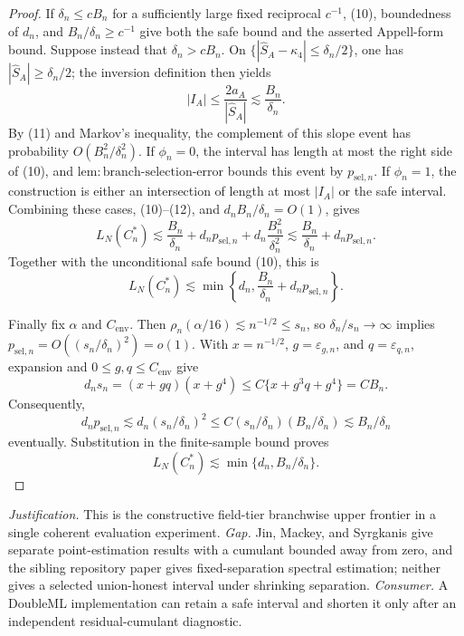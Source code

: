 \documentclass{article}
\begin{document}
\begin{proof}
If \(\delta_n\le cB_n\) for a sufficiently large fixed reciprocal \(c^{-1}\), (10), boundedness of \(d_n\), and \(B_n/\delta_n\ge c^{-1}\) give both the safe bound and the asserted Appell-form bound.  Suppose instead that \(\delta_n>cB_n\).  On \(\{|\widehat S_A-\kappa_4|\le\delta_n/2\}\), one has \(|\widehat S_A|\ge\delta_n/2\); the inversion definition then yields
\[
|I_A|\le\frac{2a_A}{|\widehat S_A|}\lesssim\frac{B_n}{\delta_n}.
\tag{12}
\]
By (11) and Markov's inequality, the complement of this slope event has probability \(O(B_n^2/\delta_n^2)\).  If \(\phi_n=0\), the interval has length at most the right side of (10), and \(\mathrm{lem:branch\mbox{-}selection\mbox{-}error}\) bounds this event by \(p_{\mathrm{sel},n}\).  If \(\phi_n=1\), the construction is either an intersection of length at most \(|I_A|\) or the safe interval.  Combining these cases, (10)--(12), and \(d_nB_n/\delta_n=O(1)\), gives
\[
L_N(C_n^*)
\lesssim \frac{B_n}{\delta_n}+d_np_{\mathrm{sel},n}
+d_n\frac{B_n^2}{\delta_n^2}
\lesssim \frac{B_n}{\delta_n}+d_np_{\mathrm{sel},n}.
\]
Together with the unconditional safe bound (10), this is
\[
L_N(C_n^*)\lesssim
\min\left\{d_n,\frac{B_n}{\delta_n}+d_np_{\mathrm{sel},n}\right\}.
\]

Finally fix \(\alpha\) and \(C_{\mathrm{env}}\).  Then \(\rho_n(\alpha/16)\lesssim n^{-1/2}\le s_n\), so \(\delta_n/s_n\to\infty\) implies \(p_{\mathrm{sel},n}=O((s_n/\delta_n)^2)=o(1)\).  With \(x=n^{-1/2}\), \(g=\varepsilon_{g,n}\), and \(q=\varepsilon_{q,n}\), expansion and \(0\le g,q\le C_{\mathrm{env}}\) give
\[
d_ns_n=(x+gq)(x+g^4)
\le C\{x+g^3q+g^4\}=CB_n.
\tag{13}
\]
Consequently,
\[
d_np_{\mathrm{sel},n}
\lesssim d_n(s_n/\delta_n)^2
\le C(s_n/\delta_n)(B_n/\delta_n)
\lesssim B_n/\delta_n
\]
eventually.  Substitution in the finite-sample bound proves
\[
L_N(C_n^*)\lesssim\min\{d_n,B_n/\delta_n\}.
\]
\end{proof}
\par\smallskip\noindent \textit{Justification.} This is the constructive field-tier branchwise upper frontier in a single coherent evaluation experiment. \textit{Gap.} Jin, Mackey, and Syrgkanis give separate point-estimation results with a cumulant bounded away from zero, and the sibling repository paper gives fixed-separation spectral estimation; neither gives a selected union-honest interval under shrinking separation. \textit{Consumer.} A DoubleML implementation can retain a safe interval and shorten it only after an independent residual-cumulant diagnostic.
\end{document}
